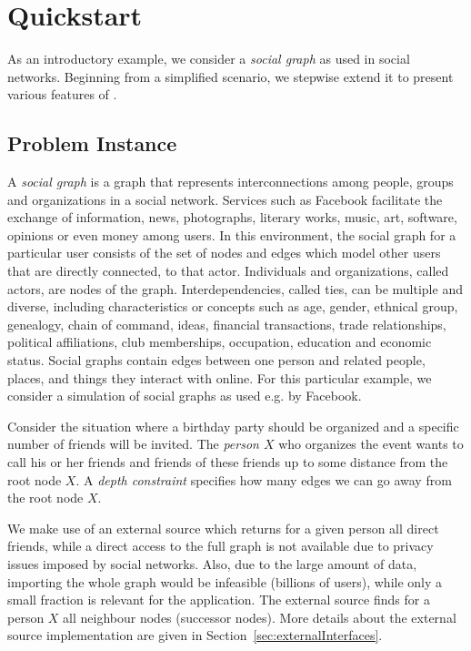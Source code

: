\documentclass[a4paper, titlepage]{article}
\begin{document}
\section{Quickstart} %
\label{sec:quick}
As an introductory example, we consider a \emph{social 
graph} as used in social networks. Beginning from a 
simplified scenario, we stepwise extend it to present 
various features of \dlvhex{}.

\subsection{Problem Instance}
A \emph{social graph} is a graph that represents 
interconnections among people, groups 
and organizations in a social network. Services such as 
Facebook facilitate the exchange 
of information, news, photographs, literary works, music, 
art, software, opinions or even 
money among users. In this environment, the social graph 
for a particular user consists 
of the set of nodes and edges which model other users that 
are directly connected, to that actor. 
Individuals and organizations, called actors, are nodes of 
the graph. Interdependencies, 
called ties, can be multiple and diverse, including 
characteristics or concepts such as age, 
gender, ethnical group, genealogy, chain of command, ideas, financial 
transactions, trade relationships, 
political affiliations, club memberships, occupation, 
education and economic status. 
Social graphs contain edges between one person and related 
people, places, and things they interact 
with online. For this particular example, we consider a 
simulation of social graphs as used e.g. by Facebook. 

Consider the situation where a birthday party should be 
organized and a specific number of friends will be invited. 
The \emph{person $X$} who organizes the event wants to 
call his or her friends and friends of these friends up to 
some distance from the root node $X$. A \emph{depth 
constraint} specifies how many edges we can go away from 
the root node $X$.
 

We make use of an external source which returns for a given 
person all direct friends, while a direct access to the 
full graph is not available due to privacy issues imposed 
by social networks. Also, due to the large amount of data, 
importing the whole graph would be infeasible (billions of 
users), while only a small fraction is relevant for the 
application. The external source finds for a person $X$ all 
neighbour nodes (successor nodes). More details about the 
external source implementation are given in 
Section~\ref{sec:externalInterfaces}. 
               
\end{document}

